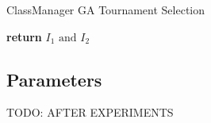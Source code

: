 \begin{algorithm}[H]
    \caption{ClassManager GA Tournament Selection}
    \begin{algorithmic}[1]
            \State \textbf{return} $I_{1} \text{ and } I_{2}$
        \EndProcedure
    \end{algorithmic}
\end{algorithm}

\subsection{Parameters}

TODO: AFTER EXPERIMENTS

